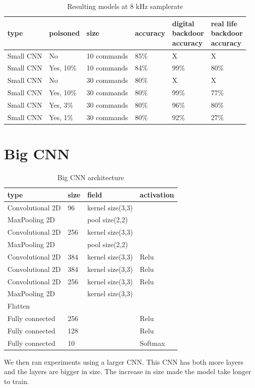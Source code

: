 \documentclass{report}
\theoremstyle{definition}
\theoremstyle{remark}
\begin{document}
\begin{table}[!hbt]
\centering
\begin{tabular}{|l|l|l|l|l|l|}
\hline
type & poisoned & size & accuracy &  \thead{digital \\ backdoor \\ accuracy} & \thead{real life \\ backdoor \\ accuracy} \\ \hline
Small CNN & No  &  10 commands  &  85\% & X & X \\ \hline
Small CNN & Yes, 10\%  &  10 commands  & 84\% &  99\% & 80\%  \\ \hline
Small CNN & No  &  30 commands  &  80\% & X &  X   \\ \hline
Small CNN & Yes, 10\%  &  30 commands  &  80\% & 99\% &  77\%   \\ \hline
Small CNN & Yes, 3\%  &  30 commands  &  80\%  & 96\% &  80\%   \\ \hline
Small CNN & Yes, 1\%  &  30 commands  &  80\%  & 92\% &  27\%   \\ \hline

\end{tabular}
\caption{Resulting models at 8 kHz samplerate}
\end{table}

\section{Big CNN}

\begin{table}[!hbt]
\centering
\begin{tabular}{llll}
\hline
type & size & field & activation \\ \hline
Convolutional 2D & 96 & kernel size(3,3) &  \\
MaxPooling 2D &  & pool size(2,2) &  \\
Convolutional 2D & 256 & kernel size(3,3) &  \\
MaxPooling 2D &  & pool size(2,2) &  \\
Convolutional 2D & 384 & kernel size(3,3) & Relu \\
Convolutional 2D & 384 & kernel size(3,3) & Relu \\
Convolutional 2D & 256 & kernel size(3,3) & Relu \\
MaxPooling 2D & & kernel size(3,3) &  \\
Flatten & & &  \\
Fully connected & 256 & & Relu  \\
Fully connected & 128 & & Relu \\ 
Fully connected & 10 & & Softmax \\ 
\hline
\end{tabular}
\caption{Big CNN architecture}
\label{tab:big_cnn}
\end{table}
We then ran experiments using a larger CNN. This CNN has both more layers and the layers are bigger in size. The increase in size made the model take longer to train. 
\end{document}
